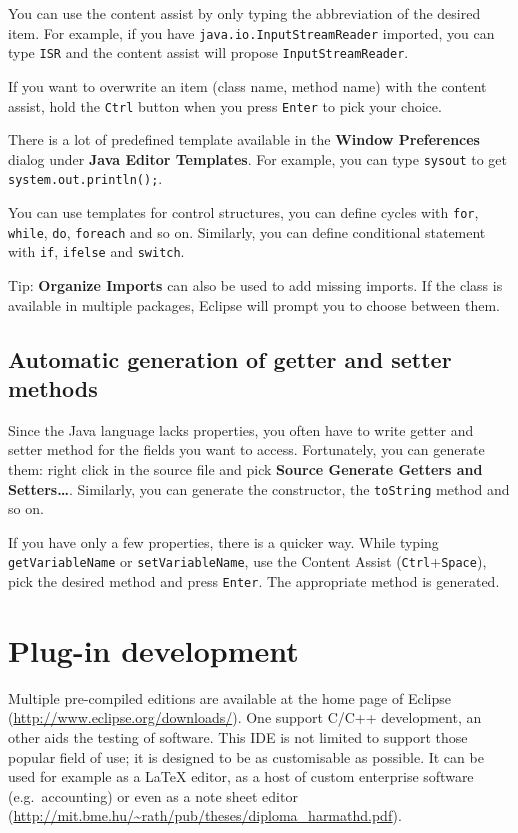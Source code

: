 \documentclass[]{report}
\begin{document}
You can use the content assist by only typing the abbreviation of the
desired item. For example, if you have
\texttt{java.io.InputStreamReader} imported, you can type \texttt{ISR}
and the content assist will propose \texttt{InputStreamReader}.

If you want to overwrite an item (class name, method name) with the
content assist, hold the \texttt{Ctrl} button when you press
\texttt{Enter} to pick your choice.

There is a lot of predefined template available in the \textbf{Window
\textbar{} Preferences} dialog under \textbf{Java \textbar{} Editor
\textbar{} Templates}. For example, you can type \texttt{sysout} to get
\texttt{system.out.println();}.

You can use templates for control structures, you can define cycles with
\texttt{for}, \texttt{while}, \texttt{do}, \texttt{foreach} and so on.
Similarly, you can define conditional statement with \texttt{if},
\texttt{ifelse} and \texttt{switch}.

Tip: \textbf{Organize Imports} can also be used to add missing imports.
If the class is available in multiple packages, Eclipse will prompt you
to choose between them.

\subsection{Automatic generation of getter and setter methods}

Since the Java language lacks properties, you often have to write getter
and setter method for the fields you want to access. Fortunately, you
can generate them: right click in the source file and pick
\textbf{Source \textbar{} Generate Getters and Setters\ldots{}}.
Similarly, you can generate the constructor, the \texttt{toString}
method and so on.

If you have only a few properties, there is a quicker way. While typing
\texttt{getVariableName} or \texttt{setVariableName}, use the Content
Assist (\texttt{Ctrl}+\texttt{Space}), pick the desired method and press
\texttt{Enter}. The appropriate method is generated.

\section{Plug-in development}

Multiple pre-compiled editions are available at the home page of Eclipse
(\url{http://www.eclipse.org/downloads/}). One support C/C++
development, an other aids the testing of software. This IDE is not
limited to support those popular field of use; it is designed to be as
customisable as possible. It can be used for example as a LaTeX editor,
as a host of custom enterprise software (e.g.~accounting) or even as a
note sheet editor
(\url{http://mit.bme.hu/~rath/pub/theses/diploma_harmathd.pdf}).
\end{document}
